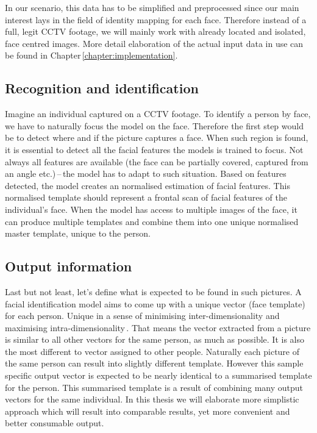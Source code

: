 In our scenario, this data has to be simplified and preprocessed since our main interest lays in the field of identity mapping for each face. Therefore instead of a full, legit CCTV footage, we will mainly work with already located and isolated, face centred images. More detail elaboration of the actual input data in use can be found in Chapter\,\ref{chapter:implementation}.

\subsection{Recognition and identification}

Imagine an individual captured on a CCTV footage. To identify a person by face, we have to naturally focus the model on the face. Therefore the first step would be to detect where and if the picture captures a face. When such region is found, it is essential to detect all the facial features the models is trained to focus. Not always all features are available (the face can be partially covered, captured from an angle etc.)\,--\,the model has to adapt to such situation. Based on features detected, the model creates an normalised estimation of facial features. This normalised template should represent a frontal scan of facial features of the individual's face. When the model has access to multiple images of the face, it can produce multiple templates and combine them into one unique normalised master template, unique to the person.

\subsection{Output information}

Last but not least, let's define what is expected to be found in such pictures. A facial identification model aims to come up with a unique vector (face template) for each person. Unique in a sense of minimising inter-dimensionality and maximising intra-dimensionality\,\cite{jain2000biometric}. That means the vector extracted from a picture is similar to all other vectors for the same person, as much as possible. It is also the most different to vector assigned to other people. Naturally each picture of the same person can result into slightly different template. However this sample specific output vector is expected to be nearly identical to a summarised template for the person. This summarised template is a result of combining many output vectors for the same individual. In this thesis we will elaborate more simplistic approach which will result into comparable results, yet more convenient and better consumable output.
